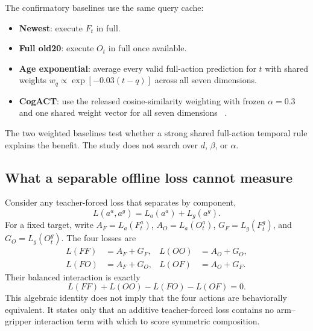 The confirmatory baselines use the same query cache:
\begin{itemize}
    \item \textbf{Newest}: execute $F_t$ in full.
    \item \textbf{Full old20}: execute $O_t$ in full once available.
    \item \textbf{Age exponential}: average every valid full-action prediction
    for $t$ with shared weights $w_q\propto\exp[-0.03(t-q)]$ across all seven
    dimensions.
    \item \textbf{CogACT}: use the released cosine-similarity weighting with
    frozen $\alpha=0.3$ and one shared weight vector for all seven dimensions
    ~\cite{li2024cogact}.
\end{itemize}
The two weighted baselines test whether a strong shared full-action temporal
rule explains the benefit. The study does not search over $d$, $\beta$, or
$\alpha$.

\subsection{What a separable offline loss cannot measure}

Consider any teacher-forced loss that separates by component,
\begin{equation}
    L(a^{a},a^{g})=L_a(a^{a})+L_g(a^{g}).
\end{equation}
For a fixed target, write $A_F=L_a(F_t^a)$, $A_O=L_a(O_t^a)$,
$G_F=L_g(F_t^g)$, and $G_O=L_g(O_t^g)$. The four losses are
\begin{align}
L(FF)&=A_F+G_F, & L(OO)&=A_O+G_O,\\
L(FO)&=A_F+G_O, & L(OF)&=A_O+G_F.
\end{align}
Their balanced interaction is exactly
\begin{equation}
L(FF)+L(OO)-L(FO)-L(OF)=0.
\label{eq:separable_identity}
\end{equation}
This algebraic identity does not imply that the four actions are behaviorally
equivalent. It states only that an additive teacher-forced loss contains no
arm--gripper interaction term with which to score symmetric composition.
